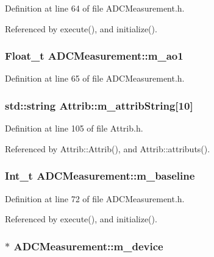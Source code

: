 Definition at line 64 of file ADCMeasurement.h.

Referenced by execute(), and initialize().\hypertarget{classADCMeasurement_a149349cc87061e2604b9e021aa63ee8c}{
\subsubsection[{m\_\-ao1}]{\setlength{\rightskip}{0pt plus 5cm}Float\_\-t {\bf ADCMeasurement::m\_\-ao1}}}
\label{classADCMeasurement_a149349cc87061e2604b9e021aa63ee8c}


Definition at line 65 of file ADCMeasurement.h.\hypertarget{classAttrib_a3414521d7a82476e874b25a5407b5e63}{
\subsubsection[{m\_\-attribString}]{\setlength{\rightskip}{0pt plus 5cm}std::string {\bf Attrib::m\_\-attribString}\mbox{[}10\mbox{]}}}
\label{classAttrib_a3414521d7a82476e874b25a5407b5e63}


Definition at line 105 of file Attrib.h.

Referenced by Attrib::Attrib(), and Attrib::attributs().\hypertarget{classADCMeasurement_aba7433a9e637389cc5425d036867a08f}{
\subsubsection[{m\_\-baseline}]{\setlength{\rightskip}{0pt plus 5cm}Int\_\-t {\bf ADCMeasurement::m\_\-baseline}}}
\label{classADCMeasurement_aba7433a9e637389cc5425d036867a08f}


Definition at line 72 of file ADCMeasurement.h.

Referenced by execute(), and initialize().\hypertarget{classADCMeasurement_afc825cc28b05894a0f762452459988e1}{
\subsubsection[{m\_\-device}]{$\ast$ {\bf ADCMeasurement::m\_\-device}}}
\label{classADCMeasurement_afc825cc28b05894a0f762452459988e1}



